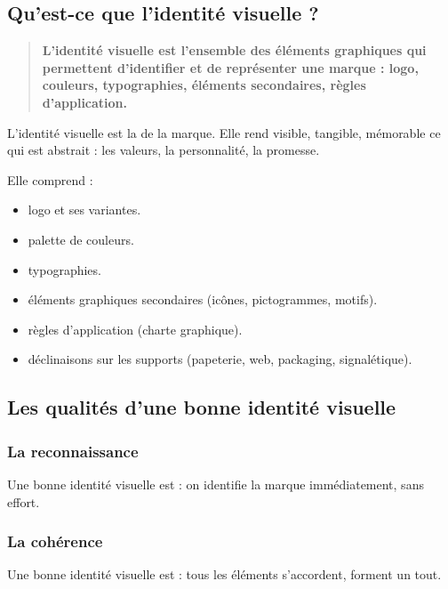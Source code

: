 \subsection{Qu'est-ce que l'identité visuelle ?}

\begin{quote}
\textbf{L'identité visuelle est l'ensemble des éléments graphiques qui permettent d'identifier et de représenter une marque : logo, couleurs, typographies, éléments secondaires, règles d'application.}
\end{quote}

L'identité visuelle est la  de la marque. Elle rend visible, tangible, mémorable ce qui est abstrait : les valeurs, la personnalité, la promesse.

Elle comprend :

\begin{itemize}
    \item {} logo et ses variantes.
    \item {} palette de couleurs.
    \item {} typographies.
    \item {} éléments graphiques secondaires (icônes, pictogrammes, motifs).
    \item {} règles d'application (charte graphique).
    \item {} déclinaisons sur les supports (papeterie, web, packaging, signalétique).
\end{itemize}

\subsection{Les qualités d'une bonne identité visuelle}

\subsubsection{La reconnaissance}

Une bonne identité visuelle est  : on identifie la marque immédiatement, sans effort.

\subsubsection{La cohérence}

Une bonne identité visuelle est  : tous les éléments s'accordent, forment un tout.

